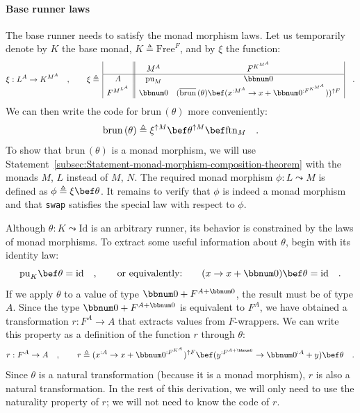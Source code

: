 \paragraph{Base runner laws}

The base runner needs to satisfy the monad morphism laws. Let us
temporarily denote by $K$ the base monad, $K\triangleq\text{Free}^{F}$,
and by $\xi$ the function:
\[
\xi:L^{A}\rightarrow K^{M^{A}}\quad,\quad\quad\xi\triangleq\,\begin{array}{|c||cc|}
 & M^{A} & F^{K^{M^{A}}}\\
\hline A & \text{pu}_{M} & \bbnum 0\\
F^{M^{L^{A}}} & \bbnum 0 & (\overline{\text{brun}}\,(\theta)\bef(x^{:M^{A}}\rightarrow x+\bbnum 0^{:F^{K^{M^{A}}}}))^{\uparrow F}
\end{array}\quad.
\]
We can then write the code for $\text{brun}\,(\theta)$ more conveniently:
\[
\text{brun}\,(\theta)\triangleq\xi^{\uparrow M}\bef\theta^{\uparrow M}\bef\text{ftn}_{M}\quad.
\]
To show that $\text{brun}\,(\theta)$ is a monad morphism, we will
use Statement~\ref{subsec:Statement-monad-morphism-composition-theorem}
with the monads $M$, $L$ instead of $M$, $N$. The required monad
morphism $\phi:L\leadsto M$ is defined as $\phi\triangleq\xi\bef\theta$.
It remains to verify that $\phi$ is indeed a monad morphism and that
\lstinline!swap! satisfies the special law with respect to $\phi$.

Although $\theta:K\leadsto\text{Id}$ is an arbitrary runner, its
behavior is constrained by the laws of monad morphisms. To extract
some useful information about $\theta$, begin with its identity law:
\[
\text{pu}_{K}\bef\theta=\text{id}\quad,\quad\quad\text{or equivalently:}\quad\quad(x\rightarrow x+\bbnum 0)\bef\theta=\text{id}\quad.
\]
If we apply $\theta$ to a value of type $\bbnum 0+F^{A+\bbnum 0}$,
the result must be of type $A$. Since the type $\bbnum 0+F^{A+\bbnum 0}$
is equivalent to $F^{A}$, we have obtained a transformation $r:F^{A}\rightarrow A$
that extracts values from $F$-wrappers. We can write this property
as a definition of the function $r$ through $\theta$:
\[
r:F^{A}\rightarrow A\quad,\quad\quad r\triangleq(x^{:A}\rightarrow x+\bbnum 0^{:F^{K^{A}}})^{\uparrow F}\bef(y^{:F^{A+\bbnum 0}}\rightarrow\bbnum 0^{:A}+y)\bef\theta\quad.
\]
Since $\theta$ is a natural transformation (because it is a monad
morphism), $r$ is also a natural transformation. In the rest of this
derivation, we will only need to use the naturality property of $r$;
we will not need to know the code of $r$.

